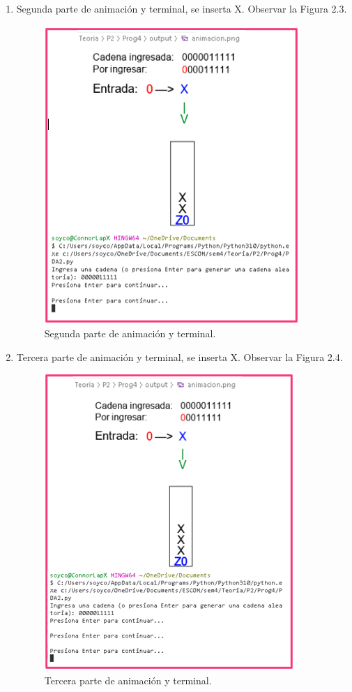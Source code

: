 \begin{enumerate}
\newpage
\item Segunda parte de animación y terminal, se inserta X. Observar la Figura 2.3.
\begin{figure}[h]
    \begin{center}
    \includegraphics[width=0.7\linewidth]{Images/Cap3.png}
    \end{center}
\caption{Segunda parte de animación y terminal.}
\label{fig:imagen}
\end{figure}

\newpage
\item Tercera parte de animación y terminal, se inserta X. Observar la Figura 2.4.
\begin{figure}[h]
    \begin{center}
    \includegraphics[width=0.7\linewidth]{Images/Cap4.png}
    \end{center}
\caption{Tercera parte de animación y terminal.}
\label{fig:imagen}
\end{figure}


\end{enumerate}
